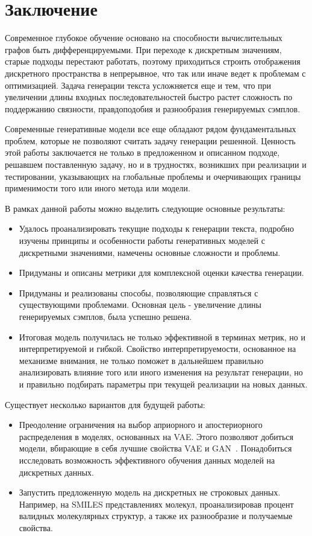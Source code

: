\documentclass{spbau-diploma}
\begin{document}
\section*{Заключение}
Современное глубокое обучение основано на способности вычислительных графов
быть дифференцируемыми. При переходе к дискретным значениям, старые подходы
перестают работать, поэтому приходиться строить отображения дискретного 
пространства в непрерывное, что так или иначе ведет к проблемам с оптимизацией.
Задача генерации текста усложняется еще и тем, что 
при увеличении длины входных последовательностей быстро растет сложность по 
поддержанию связности, правдоподобия и разнообразия генерируемых сэмплов.

Современные генеративные модели все еще обладают рядом фундаментальных проблем,
которые не позволяют считать задачу генерации решенной. Ценность этой работы 
заключается не только в предложенном и описанном подходе, решавшем 
поставленную задачу, но и в трудностях, возникших при реализации и  
тестировании, указывающих на глобальные проблемы и очерчивающих границы 
применимости того или иного метода или модели.

В рамках данной работы можно выделить следующие основные результаты:
\begin{itemize}
    \item Удалось проанализировать текущие подходы к генерации текста, подробно изучены принципы и особенности работы генеративных моделей с дискретными значениями, намечены основные сложности и проблемы.
    \item Придуманы и описаны метрики для комплексной оценки качества генерации.
    \item Придуманы и реализованы способы, позволяющие справляться с существующими проблемами. Основная цель - увеличение длины генерируемых сэмплов, была успешно решена.
    \item Итоговая модель получилась не только эффективной в терминах метрик, но и интерпретируемой и гибкой. Свойство интерпретируемости, основанное на механизме внимания, не только поможет в дальнейшем правильно анализировать влияние того или иного изменения на результат генерации, но и правильно подбирать параметры при текущей реализации на новых данных.
\end{itemize}

Существует несколько вариантов для будущей работы:
\begin{itemize}
    \item Преодоление ограничения на выбор априорного и апостериорного распределения в моделях, основанных на VAE. Этого позволяют добиться модели, вбирающие в себя лучшие свойства VAE и GAN~\cite{vetrovgan, aae, alphagan}. Понадобиться исследовать возможность эффективного обучения данных моделей на дискретных данных.
    \item Запустить предложенную модель на дискретных не строковых данных. Например, на SMILES представлениях молекул, проанализировав процент валидных молекулярных структур, а также их разнообразие и получаемые свойства.
\end{itemize}



\end{document}
